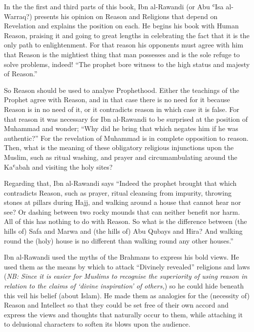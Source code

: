 \documentclass[12pt]{memoir}
\def\`{ʿ} %
\newcommand{\NB}[1]{\emph{\small NB: #1}}
\begin{document}

In the the first and third parts of this book, Ibn al-Rawandi
(or Abu \`Isa al-Warraq?) presents his opinion
on Reason and Religions that depend on Revelation
and explains the position on each.
He begins his book with Human Reason,
praising it and going to great lengths in celebrating the fact that it is the
only path to enlightenment. For that reason his opponents must agree with him
that Reason is the mightiest thing that man possesses and is the sole refuge to
solve problems, indeed! “The prophet bore witness to the high status and
majesty of Reason.”\footnotemark


So Reason should be used to analyse Prophethood. Either the teachings of the
Prophet agree with Reason, and in that case there is no need for it because
Reason is in no need of it, or it contradicts reason in which case it is false.
For that reason it was necessary for Ibn al-Rawandi to be surprised
at the position of Muhammad and wonder;
“Why did he bring that which negates him
if he was authentic?”\footnotemark{}\@
For the revelation of Muhammad is in complete opposition to reason.
Then, what is the meaning of these obligatory religious
injunctions upon the Muslim, such as ritual washing, and prayer and
circumambulating around the Ka\`abah and visiting the holy sites?


Regarding that, Ibn al-Rawandi says “Indeed the prophet brought that which
contradicts Reason, such as prayer, ritual cleansing from impurity, throwing
stones at pillars during Hajj, and walking around a house that cannot hear nor
see? Or dashing between two rocky mounds that can neither benefit nor harm. All
of this has nothing to do with Reason. So what is the difference between (the
hills of) Safa and Marwa and (the hills of) Abu Qubays and Hira? And walking
round the (holy) house is no different than walking round any other
houses.”\footnotemark


Ibn al-Rawandi used the myths of the Brahmans to express his bold views.
He used them as the means by which to attack
“Divinely revealed” religions and laws
(\NB{Since it is easier for Muslims to recognise the superiority of using
reason in relation to the claims of ‘divine inspiration’ of others,})
so he could hide beneath this veil his belief (about Islam).
He made them as
analogies for the (necessity of) Reason and Intellect so that they could be set
free of their own accord and express the views and thoughts that naturally
occur to them, while attaching it to delusional characters to soften its blows
upon the audience.
\end{document}
